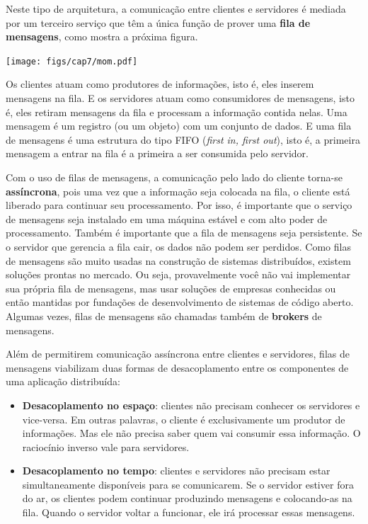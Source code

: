 \documentclass[
  11pt,
  twoside]{book}
\let\origfigure\figure
\let\endorigfigure\endfigure
\renewenvironment{figure}[1][2] {
    \expandafter\origfigure\expandafter[!h]
} {
    \endorigfigure
}
\begin{document}

Neste tipo de arquitetura, a comunicação entre clientes e servidores é
mediada por um terceiro serviço que têm a única função de prover uma
\textbf{fila de mensagens}, como mostra a próxima figura.

\begin{figure}
\centering
\texttt{[image: figs/cap7/mom.pdf]}
\caption{Arquitetura Orientada a Mensagens}
\end{figure}

Os clientes atuam como produtores de informações, isto é, eles inserem
mensagens na fila. E os servidores atuam como consumidores de mensagens,
isto é, eles retiram mensagens da fila e processam a informação contida
nelas. Uma mensagem é um registro (ou um objeto) com um conjunto de
dados. E uma fila de mensagens é uma estrutura do tipo FIFO (\emph{first
in, first out}), isto é, a primeira mensagem a entrar na fila é a
primeira a ser consumida pelo servidor.

Com o uso de filas de mensagens, a comunicação pelo lado do cliente
torna-se \textbf{assíncrona}, pois uma vez que a informação seja
colocada na fila, o cliente está liberado para continuar seu
processamento. Por isso, é importante que o serviço de mensagens seja
instalado em uma máquina estável e com alto poder de processamento.
Também é importante que a fila de mensagens seja persistente. Se o
servidor que gerencia a fila cair, os dados não podem ser perdidos. Como
filas de mensagens são muito usadas na construção de sistemas
distribuídos, existem soluções prontas no mercado. Ou seja,
provavelmente você não vai implementar sua própria fila de mensagens,
mas usar soluções de empresas conhecidas ou então mantidas por fundações
de desenvolvimento de sistemas de código aberto. Algumas vezes, filas de
mensagens são chamadas também de \textbf{brokers} de mensagens.

Além de permitirem comunicação assíncrona entre clientes e servidores,
filas de mensagens viabilizam duas formas de desacoplamento entre os
componentes de uma aplicação distribuída:

\begin{itemize}
\item
  \textbf{Desacoplamento no espaço}:
  clientes não precisam conhecer os servidores e vice-versa. Em outras
  palavras, o cliente é exclusivamente um produtor de informações. Mas
  ele não precisa saber quem vai consumir essa informação. O raciocínio
  inverso vale para servidores.
\item
  \textbf{Desacoplamento no tempo}:
  clientes e servidores não precisam estar simultaneamente disponíveis
  para se comunicarem. Se o servidor estiver fora do ar, os clientes
  podem continuar produzindo mensagens e colocando-as na fila. Quando o
  servidor voltar a funcionar, ele irá processar essas mensagens.
\end{itemize}
\end{document}
